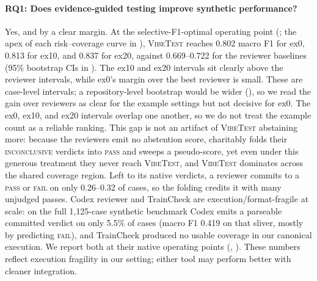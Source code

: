 \documentclass[11pt]{article}
\newcommand{\pass}{\textsc{pass}}
\newcommand{\fail}{\textsc{fail}}
\newcommand{\inconclusive}{\textsc{inconclusive}}
\newcommand{\vibetest}{\textsc{VibeTest}}
\begin{document}
\paragraph{RQ1: Does evidence-guided testing improve synthetic performance?}
Yes, and by a clear margin.
At the selective-F1-optimal operating point (; the apex of
each risk--coverage curve in ), \vibetest{} reaches
0.802 macro F1 for ex0, 0.813 for ex10, and 0.837 for ex20, against 0.669--0.722
for the reviewer baselines (95\% bootstrap CIs in ).
The ex10 and ex20 intervals sit clearly above the reviewer intervals, while
ex0's margin over the best reviewer is small.
These are case-level intervals; a repository-level bootstrap would be wider
(), so we read the gain over reviewers as clear for the
example settings but not decisive for ex0.
The ex0, ex10, and ex20 intervals overlap one another, so we do not treat the
example count as a reliable ranking.
This gap is not an artifact of \vibetest{} abstaining more: because the
reviewers emit no abstention score,  charitably folds
their \inconclusive{} verdicts into \pass{} and sweeps a pseudo-score, yet even
under this generous treatment they never reach \vibetest{}, and \vibetest{}
dominates across the shared coverage region.
Left to its native verdicts, a reviewer commits to a \pass{} or \fail{} on only
0.26--0.32 of cases, so the folding credits it with many unjudged passes.
Codex reviewer and TrainCheck are execution/format-fragile at scale: on the full
1{,}125-case synthetic benchmark Codex emits a parseable committed verdict on
only 5.5\% of cases (macro F1 0.419 on that sliver, mostly by predicting \fail),
and TrainCheck produced no usable coverage in our canonical execution.
We report both at their native operating points (,
).
These numbers reflect execution fragility in our setting; either tool may
perform better with cleaner integration.
\end{document}
